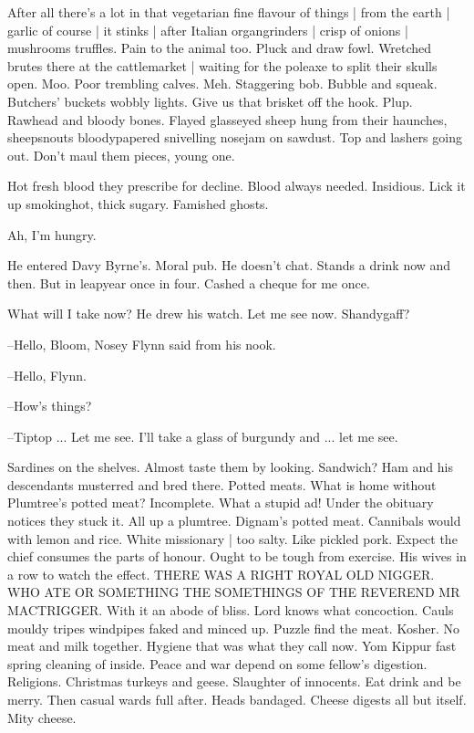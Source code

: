 After all there's a lot in that vegetarian fine flavour of things |
from the earth |
garlic of course |
it stinks |
after Italian organgrinders |
crisp of onions |
mushrooms truffles.
Pain to the animal too.
Pluck and draw fowl.
Wretched brutes there at the cattlemarket |
waiting for the poleaxe to split their skulls open.
Moo.
Poor trembling calves.
Meh.
Staggering bob.
Bubble and squeak.
Butchers' buckets wobbly lights.
Give us that brisket off the hook.
Plup.
Rawhead and bloody bones.
Flayed glasseyed sheep hung from their haunches,
sheepsnouts bloodypapered snivelling nosejam on sawdust.
Top and lashers going out.
Don't maul them pieces, young one.

Hot fresh blood they prescribe for decline.
Blood always needed.
Insidious.
Lick it up smokinghot, thick sugary.
Famished ghosts.

Ah, I'm hungry.

He entered Davy Byrne's.
Moral pub.
He doesn't chat.
Stands a drink now and then.
But in leapyear once in four.
Cashed a cheque for me once.

What will I take now?
He drew his watch.
Let me see now.
Shandygaff?

--Hello,
Bloom,
Nosey Flynn said from his nook.

--Hello,
Flynn.

--How's things?

--Tiptop ...
Let me see.
I'll take a glass of burgundy and ...
let me see.

Sardines on the shelves.
Almost taste them by looking.
Sandwich?
Ham and his descendants musterred and bred there.
Potted meats.
What is home without Plumtree's potted meat?
Incomplete.
What a stupid ad!
Under the obituary notices they stuck it.
All up a plumtree.
Dignam's potted meat.
Cannibals would with lemon and rice.
White missionary |
too salty.
Like pickled pork.
Expect the chief consumes the parts of honour.
Ought to be tough from exercise.
His wives in a row to watch the effect.
THERE WAS A RIGHT ROYAL OLD NIGGER.
WHO ATE OR SOMETHING THE SOMETHINGS
OF THE REVEREND MR MACTRIGGER.
With it an abode of bliss.
Lord knows what concoction.
Cauls mouldy tripes windpipes faked and minced up.
Puzzle find the meat.
Kosher.
No meat and milk together.
Hygiene that was what they call now.
Yom Kippur fast spring cleaning of inside.
Peace and war depend on some fellow's digestion.
Religions.
Christmas turkeys and geese.
Slaughter of innocents.
Eat drink and be merry.
Then casual wards full after.
Heads bandaged.
Cheese digests all but itself.
Mity cheese.

